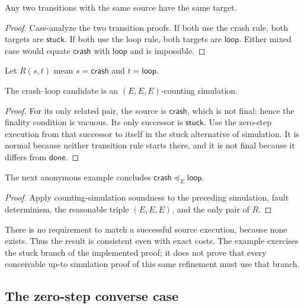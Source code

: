 \begin{lemma}
Any two transitions with the same source have the same target.
\end{lemma}
\begin{proof}
Case-analyze the two transition proofs. If both use the crash rule,
both targets are $\mathsf{stuck}$. If both use the loop rule, both
targets are $\mathsf{loop}$. Either mixed case would equate
$\mathsf{crash}$ with $\mathsf{loop}$ and is impossible.
\end{proof}

\begin{definition}
Let $R(s,t)$ mean $s=\mathsf{crash}$ and $t=\mathsf{loop}$.
\end{definition}

\begin{lemma}
The crash--loop candidate is an $(E,E,E)$-counting simulation.
\end{lemma}
\begin{proof}
For its only related pair, the source is $\mathsf{crash}$, which is
not final; hence the finality condition is vacuous. Its only successor
is $\mathsf{stuck}$. Use the zero-step execution from that successor
to itself in the stuck alternative of simulation. It is normal because
neither transition rule starts there, and it is not final because it
differs from $\mathsf{done}$.
\end{proof}

The next anonymous example concludes
$\mathsf{crash}\preceq_E\mathsf{loop}$.
\begin{proof}
Apply counting-simulation soundness to the preceding simulation, fault
determinism, the reasonable triple $(E,E,E)$, and the only pair of $R$.
\end{proof}
There is no requirement to match a successful source execution, because
none exists. Thus the result is consistent even with exact costs. The
example exercises the stuck branch of the implemented proof; it does
not prove that every conceivable up-to simulation proof of this same
refinement must use that branch.

\subsection{The zero-step converse case}

